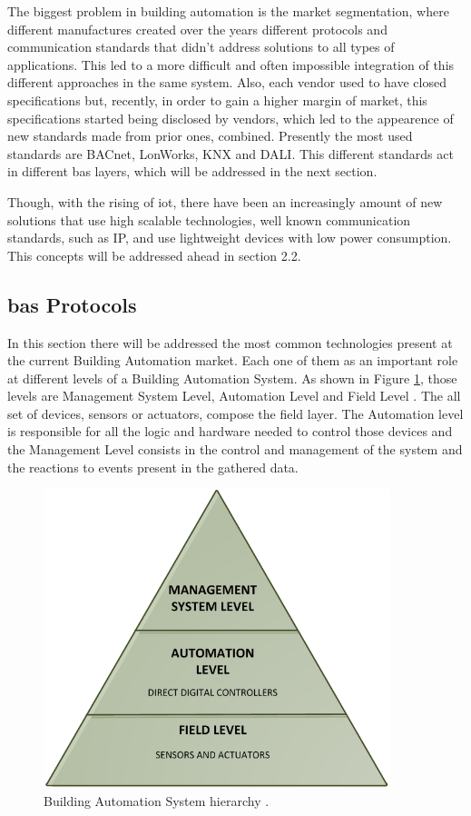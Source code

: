 The biggest problem in building automation is the market segmentation, where different manufactures created over the years different protocols and communication standards that didn't address solutions to all types of applications. This led to a more difficult and often impossible integration of this different approaches in the same system. Also, each vendor used to have closed specifications but, recently, in order to gain a higher margin of market, this specifications started being disclosed by vendors, which led to the appearence of new standards made from prior ones, combined. Presently the most used standards are BACnet, LonWorks, KNX and DALI. This different standards act in different \ac{bas} layers, which will be addressed in the next section. 

Though, with the rising of \ac{iot}, there have been an increasingly amount of new solutions that use high scalable technologies, well known communication standards, such as IP,  and use lightweight devices with low power consumption. This concepts will be addressed ahead in section 2.2.


\subsection{\ac{bas} Protocols}

In this section there will be addressed the most common technologies present at the current Building Automation market. Each one of them as an important role at different levels of a Building Automation System. As shown in Figure \ref{fig:hierarchy}, those levels are Management System Level, Automation Level and Field Level \cite{Iwayemi2011}. The all set of devices, sensors or actuators, compose the field layer. The Automation level is responsible for all the logic and hardware needed to control those devices and the Management Level consists in the control and management of the system and the reactions to events present in the gathered data.

\begin{figure}[H]
	\centering
	\includegraphics[width=0.9\textwidth]{figures/hierarchy.png}
	\caption{Building Automation System hierarchy \cite{kastener}. }
	\label{fig:hierarchy}
\end{figure}

